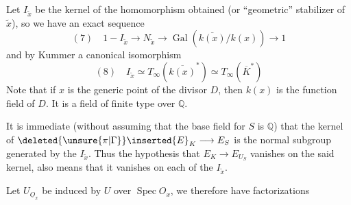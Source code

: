 Let $I_{\widetilde x}$ be the kernel of the homomorphism obtained (or ``geometric'' stabilizer of $\widetilde x$), so we have an exact sequence
\[
(7)\quad 1-I_{\widetilde x}\longrightarrow N_{\widetilde x}\longrightarrow\operatorname{Gal}(\overline{k(x)}/k(x))\longrightarrow1
\]
and by Kummer a canonical isomorphism
\[
(8)\quad I_{\widetilde x}\simeq T_\infty(\overline{k(x)}^*)\simeq T_\infty(\overline K^*)
\]
Note that if $x$ is the generic point of the divisor $D$, then $k(x)$ is the function field of $D$. It is a field of finite type over $\mathbb Q$.

It is immediate (without assuming that the base field for $S$ is $\mathbb Q$) that the kernel of $\deleted{\unsure{\pi|\Gamma}}\inserted{E}_K\longrightarrow E_S$ is the normal subgroup generated by the $I_{\widetilde x}$. Thus the hypothesis that $E_K\longrightarrow E_{U_S}$ vanishes on the said kernel, also means that it vanishes on each of the $I_{\widetilde x}$.

Let  $U_{\underline O_x}$ be induced by $U$ over $\operatorname{Spec}O_x$, we therefore have factorizations
